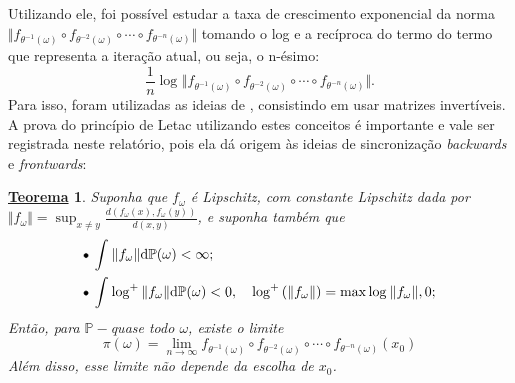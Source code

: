 \documentclass[12pt, a4paper]{article}
\newtheorem*{theorem*}{\underline{Teorema}}
\theoremstyle{definition}
\begin{document}
Utilizando ele, foi possível estudar a taxa de crescimento exponencial da norma \(\Vert f_{\theta^{-1}(\omega )}\circ f_{\theta^{-2}(\omega )}\circ\cdots\circ f_{\theta^{-n}(\omega )} \Vert\) tomando o log e a recíproca do termo do termo que representa a iteração atual, ou seja, o n-ésimo:
\[
	\frac{1}{n}\log^{}{\Vert f_{\theta^{-1}(\omega )}\circ f_{\theta^{-2}(\omega )}\circ\cdots\circ f_{\theta^{-n}(\omega )} \Vert}.
\]
Para isso, foram utilizadas as ideias de \cite{Furstenberg1960}, consistindo em usar matrizes invertíveis. A prova do princípio de Letac utilizando estes conceitos é importante e vale ser registrada neste relatório, pois ela dá origem às ideias de sincronização \textit{backwards} e \textit{frontwards}:
\begin{theorem*}
	Suponha que \(f_{\omega }\) é Lipschitz, com constante Lipschitz dada por \(\Vert f_{\omega } \Vert = \sup_{x\neq y} \frac{d(f_{\omega }(x), f_{\omega }(y))}{d(x, y)}\), e suponha também que
	\begin{align*}
		 & \tikz[baseline=-0.5ex]\draw[black, fill=black, radius=1.5pt](0, 0)circle; \; \int_{}^{}\Vert f_{\omega } \Vert \mathrm{d} \mathbb{P}(\omega ) < \infty;                                                                                              \\
		 & \tikz[baseline=-0.5ex]\draw[black, fill=black, radius=1.5pt](0, 0)circle; \; \int_{}^{} \log^{+}{\Vert f_{\omega } \Vert} \mathrm{d} \mathbb{P}(\omega ) < 0, \quad \log^{+}{(\Vert f_{\omega } \Vert)} = \max{\log^{}{\Vert f_{\omega } \Vert}, 0};
	\end{align*}
	Então, para \(\mathbb{P}-\)quase todo \(\omega \), existe o limite
	\[
		\pi (\omega )=\lim_{n\to \infty}f_{\theta^{-1}(\omega )}\circ f_{\theta^{-2}(\omega )}\circ\cdots\circ f_{\theta^{-n}(\omega )}(x_{0})
	\]
	Além disso, esse limite não depende da escolha de \(x_{0}\).
\end{theorem*}
\end{document}
